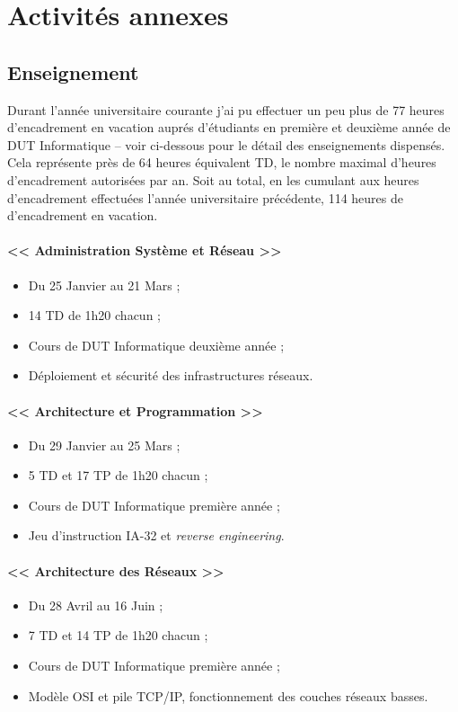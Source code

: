 \section{Activités annexes}
\label{sec:other}
  \subsection{Enseignement}

    Durant l'année universitaire courante j'ai pu effectuer un peu plus de 77
    heures d'encadrement en vacation auprés d'étudiants en première et deuxième
    année de DUT Informatique -- voir ci-dessous pour le détail des
    enseignements dispensés. Cela représente près de 64 heures équivalent TD, le
    nombre maximal d'heures d'encadrement autorisées par an. Soit au total, en
    les cumulant aux heures d'encadrement effectuées l’année universitaire
    précédente, 114 heures de d'encadrement en vacation.
    
    \paragraph{<< Administration Système et Réseau >>}
    { \begin{itemize}
        \item Du 25 Janvier au 21 Mars ;
        \item 14 TD de 1h20 chacun ;
        \item Cours de DUT Informatique deuxième année ;
        \item Déploiement et sécurité des infrastructures réseaux. 
      \end{itemize} }

    \paragraph{<< Architecture et Programmation >>}
    { \begin{itemize}
        \item Du 29 Janvier au 25 Mars ;
        \item 5 TD et 17 TP de 1h20 chacun ;
        \item Cours de DUT Informatique première année ;
        \item Jeu d'instruction IA-32 et \emph{reverse engineering}.
      \end{itemize} }

    \paragraph{<< Architecture des Réseaux >>}
    { \begin{itemize}
        \item Du 28 Avril au 16 Juin ;
        \item 7 TD et 14 TP de 1h20 chacun ;
        \item Cours de DUT Informatique première année ;
        \item Modèle OSI et pile TCP/IP, fonctionnement des couches réseaux
          basses.
      \end{itemize} }

